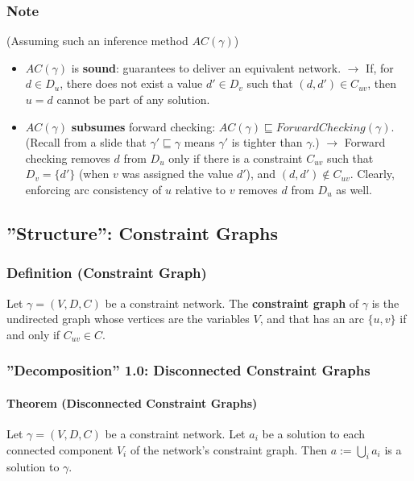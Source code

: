 \documentclass[conference, a4paper]{styles/acmsiggraph}
\newcommand\subsubsubsection{\paragraph}
\begin{document}
        \subsubsection{Note}
            (Assuming such an inference method $AC(\gamma)$)
            \begin{itemize}
                \item $AC(\gamma)$ is \textbf{sound}: guarantees to deliver an equivalent network.\newline
                $\rightarrow$ If, for $d \in D_u$, there does not exist a value $d' \in D_v$ such that $(d,d') \in C_{uv}$, then $u=d$ cannot be part of any solution.
                \item $AC(\gamma)$ \textbf{subsumes} forward checking: $AC(\gamma) \sqsubseteq ForwardChecking(\gamma)$.\newline
                (Recall from a slide that $\gamma' \sqsubseteq \gamma$ means $\gamma'$ is tighter than $\gamma$.)\newline
                $\rightarrow$ Forward checking removes $d$ from $D_u$ only if there is a constraint $C_{uv}$ such that $D_v = \{d'\}$
                (when $v$ was assigned the value $d'$), and $(d,d') \notin C_{uv}$.
                Clearly, enforcing arc consistency of $u$ relative to $v$ removes $d$ from $D_u$ as well.
            \end{itemize}
    
    
    
    
    
    
    \subsection{''Structure'': Constraint Graphs}
        \subsubsection{Definition (Constraint Graph)}
            Let $\gamma = (V,D,C)$ be a constraint network.
            The \textbf{constraint graph} of $\gamma$ is the undirected graph whose vertices are the variables $V$, and that has an arc $\{u,v\}$ if and only if $C_{uv} \in C$.
        
        \subsubsection{''Decomposition'' 1.0: Disconnected Constraint Graphs}
            \subsubsubsection{Theorem (Disconnected Constraint Graphs)}
                Let $\gamma = (V,D,C)$ be a constraint network.
                Let $a_i$ be a solution to each connected component $V_i$ of the network's constraint graph.
                Then $a := \bigcup\limits_{i} a_i$ is a solution to $\gamma$.\newline
                
\end{document}
